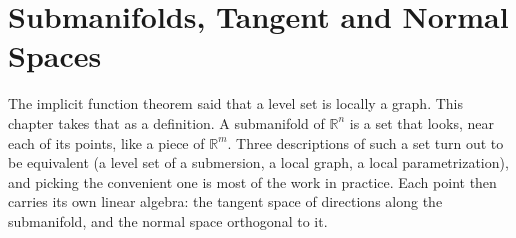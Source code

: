 \chapter{Submanifolds, Tangent and Normal Spaces}
\label{ch:submanifolds}

The implicit function theorem said that a level set is locally a graph. This chapter takes that
as a definition. A submanifold of $\mathbb{R}^n$ is a set that looks, near each of its points,
like a piece of $\mathbb{R}^m$. Three descriptions of such a set turn out to be equivalent (a
level set of a submersion, a local graph, a local parametrization), and picking the convenient
one is most of the work in practice. Each point then carries its own linear algebra: the tangent
space of directions along the submanifold, and the normal space orthogonal to it.





